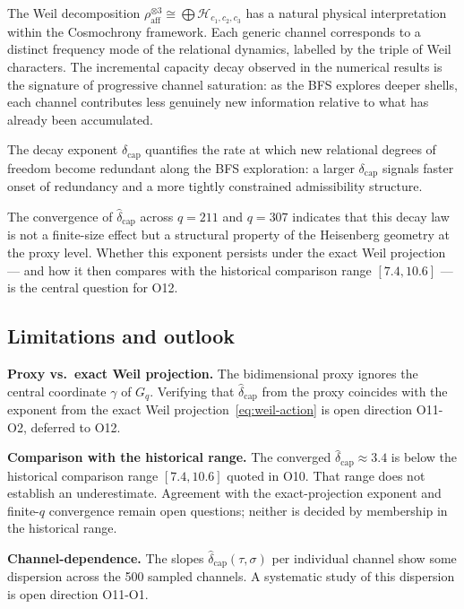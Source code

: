 \documentclass[11pt,a4paper]{article}
\newcommand{\rhoaff}{\rho_{\mathrm{aff}}}
\newcommand{\dcap}{\delta_{\mathrm{cap}}}
\begin{document}
    The Weil decomposition $\rhoaff^{\otimes 3} \cong \bigoplus \mathcal{H}_{c_1,c_2,c_3}$
    has a natural physical interpretation within the Cosmochrony framework.
    Each generic channel corresponds to a distinct frequency mode of the relational dynamics,
    labelled by the triple of Weil characters.
    The incremental capacity decay observed in the numerical results is the signature of
    progressive channel saturation: as the BFS explores deeper shells, each channel contributes
    less genuinely new information relative to what has already been accumulated.

    The decay exponent $\dcap$ quantifies the rate at which new relational degrees of freedom
    become redundant along the BFS exploration: a larger $\dcap$ signals faster onset of
    redundancy and a more tightly constrained admissibility structure.

    The convergence of $\hat\dcap$ across $q = 211$ and $q = 307$ indicates that this decay
    law is not a finite-size effect but a structural property of the Heisenberg geometry at
    the proxy level.
    Whether this exponent persists under the exact Weil projection --- and how it then compares
    with the historical comparison range $[7.4, 10.6]$ --- is the central question for O12.

  \subsection{Limitations and outlook}
    \label{sec:disc-limits}

    \textbf{Proxy vs.\ exact Weil projection.}
    The bidimensional proxy ignores the central coordinate $\gamma$ of $G_q$.
    Verifying that $\hat\dcap$ from the proxy coincides with the exponent from the exact Weil
    projection~\eqref{eq:weil-action} is open direction O11-O2, deferred to O12.

    \textbf{Comparison with the historical range.}
    The converged $\hat\dcap\approx3.4$ is below the historical comparison range $[7.4,10.6]$ quoted in O10.
    That range does not establish an underestimate.
    Agreement with the exact-projection exponent and finite-$q$ convergence remain open questions;
    neither is decided by membership in the historical range.

    \textbf{Channel-dependence.}
    The slopes $\hat\dcap(\tau,\sigma)$ per individual channel show some dispersion across the
    500 sampled channels.
    A systematic study of this dispersion is open direction O11-O1.
\end{document}
